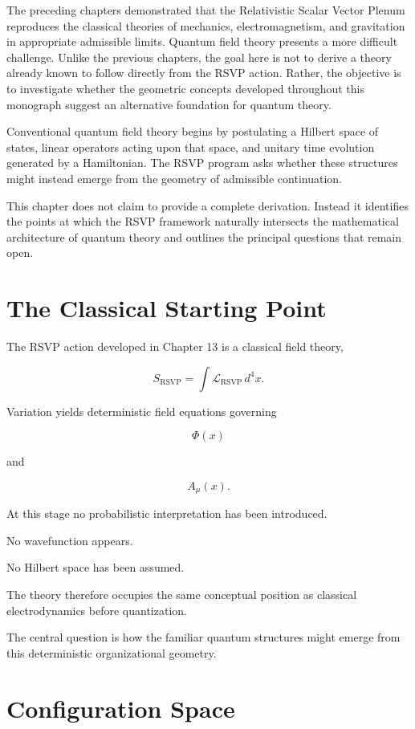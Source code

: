 \documentclass[11pt,oneside]{book}
\numberwithin{equation}{chapter}
\theoremstyle{definition}
\theoremstyle{plain}
\begin{document}
The preceding chapters demonstrated that the Relativistic Scalar Vector
Plenum reproduces the classical theories of mechanics, electromagnetism, and
gravitation in appropriate admissible limits. Quantum field theory presents
a more difficult challenge. Unlike the previous chapters, the goal here is
not to derive a theory already known to follow directly from the RSVP
action. Rather, the objective is to investigate whether the geometric
concepts developed throughout this monograph suggest an alternative
foundation for quantum theory.

Conventional quantum field theory begins by postulating a Hilbert space of
states, linear operators acting upon that space, and unitary time evolution
generated by a Hamiltonian. The RSVP program asks whether these structures
might instead emerge from the geometry of admissible continuation.

This chapter does not claim to provide a complete derivation. Instead it
identifies the points at which the RSVP framework naturally intersects the
mathematical architecture of quantum theory and outlines the principal
questions that remain open.

\section{The Classical Starting Point}

The RSVP action developed in Chapter 13 is a classical field theory,

\[
S_{\mathrm{RSVP}}
=
\int
\mathcal L_{\mathrm{RSVP}}
\,d^4x.
\]

Variation yields deterministic field equations governing

\[
\Phi(x)
\]

and

\[
A_\mu(x).
\]

At this stage no probabilistic interpretation has been introduced.

No wavefunction appears.

No Hilbert space has been assumed.

The theory therefore occupies the same conceptual position as classical
electrodynamics before quantization.

The central question is how the familiar quantum structures might emerge
from this deterministic organizational geometry.

\section{Configuration Space}
\end{document}
